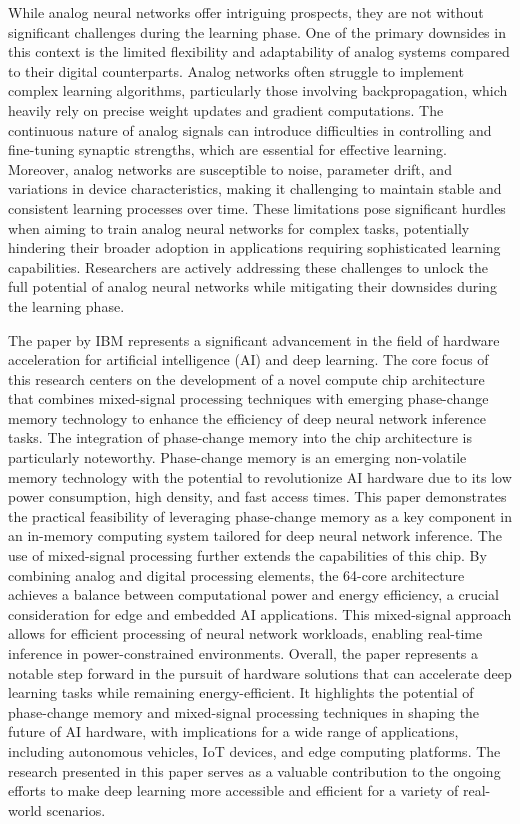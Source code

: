 \documentclass[nohyperref]{article}
\theoremstyle{plain}
\theoremstyle{definition}
\theoremstyle{remark}
\begin{document}
While analog neural networks offer intriguing prospects, they are not without significant challenges during the learning phase. One of the primary downsides in this context is the limited flexibility and adaptability of analog systems compared to their digital counterparts. Analog networks often struggle to implement complex learning algorithms, particularly those involving backpropagation, which heavily rely on precise weight updates and gradient computations. The continuous nature of analog signals can introduce difficulties in controlling and fine-tuning synaptic strengths, which are essential for effective learning. Moreover, analog networks are susceptible to noise, parameter drift, and variations in device characteristics, making it challenging to maintain stable and consistent learning processes over time. These limitations pose significant hurdles when aiming to train analog neural networks for complex tasks, potentially hindering their broader adoption in applications requiring sophisticated learning capabilities. Researchers are actively addressing these challenges to unlock the full potential of analog neural networks while mitigating their downsides during the learning phase.

The paper by IBM \cite{le202364} represents a significant advancement in the field of hardware acceleration for artificial intelligence (AI) and deep learning. The core focus of this research centers on the development of a novel compute chip architecture that combines mixed-signal processing techniques with emerging phase-change memory technology to enhance the efficiency of deep neural network inference tasks.
The integration of phase-change memory into the chip architecture is particularly noteworthy. Phase-change memory is an emerging non-volatile memory technology with the potential to revolutionize AI hardware due to its low power consumption, high density, and fast access times. This paper demonstrates the practical feasibility of leveraging phase-change memory as a key component in an in-memory computing system tailored for deep neural network inference.
The use of mixed-signal processing further extends the capabilities of this chip. By combining analog and digital processing elements, the 64-core architecture achieves a balance between computational power and energy efficiency, a crucial consideration for edge and embedded AI applications. This mixed-signal approach allows for efficient processing of neural network workloads, enabling real-time inference in power-constrained environments.
Overall, the paper represents a notable step forward in the pursuit of hardware solutions that can accelerate deep learning tasks while remaining energy-efficient. It highlights the potential of phase-change memory and mixed-signal processing techniques in shaping the future of AI hardware, with implications for a wide range of applications, including autonomous vehicles, IoT devices, and edge computing platforms. The research presented in this paper serves as a valuable contribution to the ongoing efforts to make deep learning more accessible and efficient for a variety of real-world scenarios.
\end{document}
